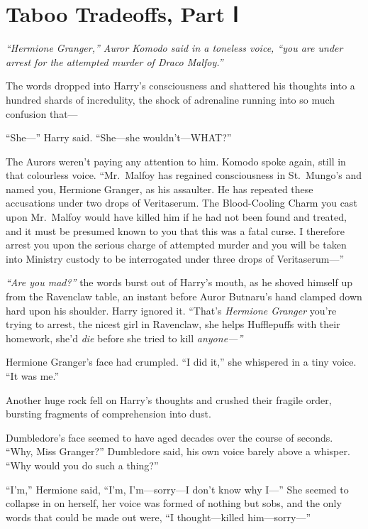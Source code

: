 \chapter{Taboo Tradeoffs, Part Ⅰ}\label{taboo-tradeoffs-part}

\emph{``Hermione Granger,'' Auror Komodo said in a toneless voice, ``you
are under arrest for the attempted murder of Draco Malfoy.''}

The words dropped into Harry's consciousness and shattered his thoughts
into a hundred shards of incredulity, the shock of adrenaline running
into so much confusion that---

``She---'' Harry said. ``She---she wouldn't---WHAT?''

The Aurors weren't paying any attention to him. Komodo spoke again,
still in that colourless voice. ``Mr.~Malfoy has regained consciousness
in St.~Mungo's and named you, Hermione Granger, as his assaulter. He has
repeated these accusations under two drops of Veritaserum. The
Blood-Cooling Charm you cast upon Mr.~Malfoy would have killed him if he
had not been found and treated, and it must be presumed known to you
that this was a fatal curse. I therefore arrest you upon the serious
charge of attempted murder and you will be taken into Ministry custody
to be interrogated under three drops of Veritaserum---''

\emph{``Are you mad?''} the words burst out of Harry's mouth, as he
shoved himself up from the Ravenclaw table, an instant before Auror
Butnaru's hand clamped down hard upon his shoulder. Harry ignored it.
``That's \emph{Hermione Granger} you're trying to arrest, the nicest
girl in Ravenclaw, she helps Hufflepuffs with their homework, she'd
\emph{die} before she tried to kill \emph{anyone---''}

Hermione Granger's face had crumpled. ``I did it,'' she whispered in a
tiny voice. ``It was me.''

Another huge rock fell on Harry's thoughts and crushed their fragile
order, bursting fragments of comprehension into dust.

Dumbledore's face seemed to have aged decades over the course of
seconds. ``Why, Miss Granger?'' Dumbledore said, his own voice barely
above a whisper. ``Why would you do such a thing?''

``I'm,'' Hermione said, ``I'm, I'm---sorry---I don't know why I---'' She
seemed to collapse in on herself, her voice was formed of nothing but
sobs, and the only words that could be made out were, ``I
thought---killed him---sorry---''

